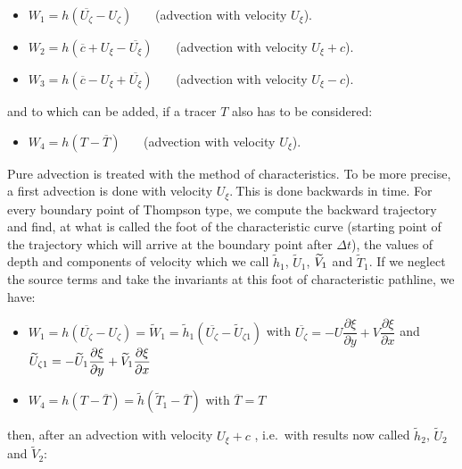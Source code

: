 \begin{itemize}
\item $W_{1}=h(\overline{U_{\zeta }}-U_{\zeta })$ \ \ \ (advection with
velocity $U_{\xi }$).

\item $W_{2}=h(\overline{c}+U_{\xi }-\overline{U_{\xi }})$ \ \ \
(advection with velocity $U_{\xi }+c$).

\item $W_{3}=h(\overline{c}-U_{\xi }+\overline{U_{\xi }})$ \ \ \
(advection with velocity $U_{\xi }-c$).
\end{itemize}

\noindent and to which can be added, if a tracer $T$ also has to be
considered:

\begin{itemize}
\item $W_{4}=h(T-\overline{T})$ \ \ \ (advection with velocity $U_{\xi }$).
\end{itemize}

Pure advection is treated with the method of characteristics. To be more
precise, a first advection is done with velocity $U_{\xi }.\ $This is done
backwards in time. For every boundary point of Thompson type, we compute the
backward trajectory and find, at what is called the foot of the
characteristic curve (starting point of the trajectory which will arrive at
the boundary point after $\Delta t$), the values of depth and components of
velocity which we call $\widetilde{h}_{1}$, $\widetilde{U}_{1}$, $\widetilde{%
V}_{1}$ and $\widetilde{T}_{1}$. If we neglect the source terms and take the
invariants at this foot of characteristic pathline, we have:

\begin{itemize}
\item $W_{1}=h(\overline{U_{\zeta }}-U_{\zeta })=\widetilde{W}_{1}=%
\widetilde{h}_{1}(\overline{U_{\zeta }}-\widetilde{U}_{\zeta 1})$ with $%
\overline{U_{\zeta }}=-U\dfrac{\partial \xi }{\partial y}+V\dfrac{\partial
\xi }{\partial x}$ and $\widetilde{U}_{\zeta 1}=-\widetilde{U}_{1}\dfrac{%
\partial \xi }{\partial y}+\widetilde{V}_{1}\dfrac{\partial \xi }{\partial x}$

\item $W_{4}=h(T-\overline{T})=\widetilde{h}(\widetilde{T}_{1}-\overline{T}) 
$ with $\overline{T}=T$
\end{itemize}

then, after an advection with velocity $U_{\xi }+c$ , i.e.\ with results
now called $\widetilde{h}_{2}$, $\widetilde{U}_{2}$ and $\widetilde{V}_{2}$:

